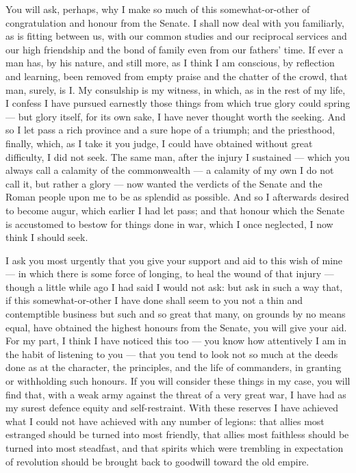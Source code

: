  You will ask, perhaps, why I make so much of this somewhat-or-other of congratulation and honour from the Senate. I shall now deal with you familiarly, as is fitting between us, with our common studies and our reciprocal services and our high friendship and the bond of family even from our fathers' time. If ever a man has, by his nature, and still more, as I think I am conscious, by reflection and learning, been removed from empty praise and the chatter of the crowd, that man, surely, is I. My consulship is my witness, in which, as in the rest of my life, I confess I have pursued earnestly those things from which true glory could spring --- but glory itself, for its own sake, I have never thought worth the seeking. And so I let pass a rich province and a sure hope of a triumph; and the priesthood, finally, which, as I take it you judge, I could have obtained without great difficulty, I did not seek. The same man, after the injury I sustained --- which you always call a calamity of the commonwealth --- a calamity of my own I do not call it, but rather a glory --- now wanted the verdicts of the Senate and the Roman people upon me to be as splendid as possible. And so I afterwards desired to become augur, which earlier I had let pass; and that honour which the Senate is accustomed to bestow for things done in war, which I once neglected, I now think I should seek.

 I ask you most urgently that you give your support and aid to this wish of mine --- in which there is some force of longing, to heal the wound of that injury --- though a little while ago I had said I would not ask: but ask in such a way that, if this somewhat-or-other I have done shall seem to you not a thin and contemptible business but such and so great that many, on grounds by no means equal, have obtained the highest honours from the Senate, you will give your aid. For my part, I think I have noticed this too --- you know how attentively I am in the habit of listening to you --- that you tend to look not so much at the deeds done as at the character, the principles, and the life of commanders, in granting or withholding such honours. If you will consider these things in my case, you will find that, with a weak army against the threat of a very great war, I have had as my surest defence equity and self-restraint. With these reserves I have achieved what I could not have achieved with any number of legions: that allies most estranged should be turned into most friendly, that allies most faithless should be turned into most steadfast, and that spirits which were trembling in expectation of revolution should be brought back to goodwill toward the old empire.

